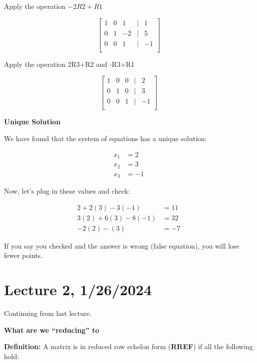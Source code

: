 \documentclass{article}
\begin{document}
Apply the operation \(-2R2+R1\)


\[
\begin{bmatrix}
    1 & 0 & 1 & | & 1 \\
    0 & 1 & -2 & | & 5 \\
    0 & 0 & 1 & | & -1 \\
\end{bmatrix}
\] 



Apply the operation 2R3+R2 and -R3+R1

\[
\begin{bmatrix}
    1 & 0 & 0 & | & 2 \\
    0 & 1 & 0 & | & 3 \\
    0 & 0 & 1 & | & -1 \\
\end{bmatrix}
\] 

\textbf{Unique Solution}

We have found that the system of equations has a unique solution:

\[
\begin{aligned}
    x_1 &= 2 \\
    x_2 &= 3 \\
    x_3 &= -1
\end{aligned}
\]

Now, let's plug in these values and check:

\[
\begin{aligned}
    2 + 2(3) - 3(-1) &= 11 \\
    3(2) + 6(3) - 8(-1) &= 32 \\
    -2(2) - (3) &= -7
\end{aligned}
\]

If you say you checked and the answer is wrong (false equation), you will lose fewer points.


\section{Lecture 2, 1/26/2024}

Continuing from last lecture.

\textbf{What are we ``reducing'' to}

\textbf{Definition:} A matrix is in reduced row echelon form (\textbf{RREF}) if all the following hold:
\end{document}
